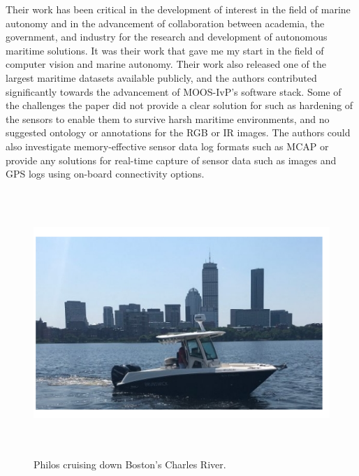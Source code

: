 Their work has been critical in the development of interest in the field of marine autonomy and in the advancement of collaboration between academia, the government, and industry for the research and development of autonomous maritime solutions. It was their work that gave me my start in the field of computer vision and marine autonomy. Their work also released one of the largest maritime datasets available publicly, and the authors contributed significantly towards the advancement of MOOS-IvP's software stack. Some of the challenges the paper did not provide a clear solution for such as hardening of the sensors to enable them to survive harsh maritime environments, and no suggested ontology or annotations for the RGB or IR images. The authors could also investigate memory-effective sensor data log formats such as MCAP or provide any solutions for real-time capture of sensor data such as images and GPS logs using on-board connectivity options\cite{benjamin2009overview}.
\begin{figure}[H]
    \centering
    \includegraphics[width=\textwidth,height=10cm,keepaspectratio=true]{src/Images/philos.PNG}
    \caption{
     Philos cruising down Boston's Charles River.\cite{defilippo2021robowhaler}
     }
\end{figure}
\\

